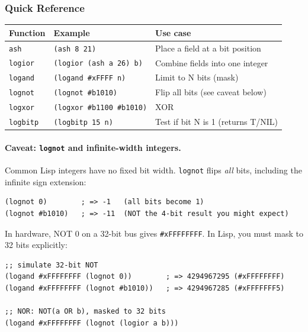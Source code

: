 \subsubsection{Quick Reference}

\begin{center}
\begin{tabular}{llp{5.5cm}}
  \toprule
  \textbf{Function} & \textbf{Example} & \textbf{Use case} \\
  \midrule
  \texttt{ash}    & \texttt{(ash 8 21)}            & Place a field at a bit position \\
  \texttt{logior} & \texttt{(logior (ash a 26) b)}  & Combine fields into one integer \\
  \texttt{logand} & \texttt{(logand \#xFFFF n)}     & Limit to N bits (mask) \\
  \texttt{lognot} & \texttt{(lognot \#b1010)}       & Flip all bits (see caveat below) \\
  \texttt{logxor} & \texttt{(logxor \#b1100 \#b1010)} & XOR \\
  \texttt{logbitp} & \texttt{(logbitp 15 n)} & Test if bit N is 1 (returns T/NIL) \\
  \bottomrule
\end{tabular}
\end{center}

\paragraph{Caveat: \texttt{lognot} and infinite-width integers.}

Common Lisp integers have no fixed bit width. \texttt{lognot} flips
\emph{all} bits, including the infinite sign extension:

\begin{lstlisting}
(lognot 0)        ; => -1   (all bits become 1)
(lognot #b1010)   ; => -11  (NOT the 4-bit result you might expect)
\end{lstlisting}

In hardware, NOT 0 on a 32-bit bus gives \texttt{\#xFFFFFFFF}.
In Lisp, you must mask to 32 bits explicitly:

\begin{lstlisting}
;; simulate 32-bit NOT
(logand #xFFFFFFFF (lognot 0))        ; => 4294967295 (#xFFFFFFFF)
(logand #xFFFFFFFF (lognot #b1010))   ; => 4294967285 (#xFFFFFFF5)

;; NOR: NOT(a OR b), masked to 32 bits
(logand #xFFFFFFFF (lognot (logior a b)))
\end{lstlisting}

